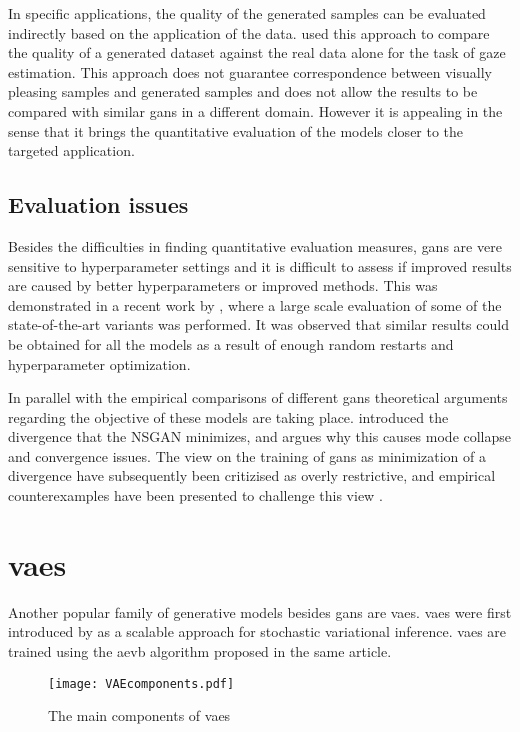 In specific applications, the quality of the generated samples can be evaluated indirectly based on the application of the data. \textcite{shrivastava2016learning} used this approach to compare the quality of a generated dataset against the real data alone for the task of gaze estimation. This approach does not guarantee correspondence between visually pleasing samples and generated samples and does not allow the results to be compared with similar \acrshort{gans} in a different domain. However it is appealing in the sense that it brings the quantitative evaluation of the models closer to the targeted application. 

\subsection{Evaluation issues}
Besides the difficulties in finding quantitative evaluation measures, \acrshort{gans} are vere sensitive to hyperparameter settings and it is difficult to assess if improved results are caused by better hyperparameters or improved methods. This was demonstrated in a recent work by \textcite{lucic2017gans}, where a large scale evaluation of some of the state-of-the-art variants was performed. It was observed that similar results could be obtained for all the models as a result of enough random restarts and hyperparameter optimization.

In parallel with the empirical comparisons of different \acrshort{gans} theoretical arguments regarding the objective of these models are taking place. \textcite{arjovsky2017towards} introduced the divergence that the NSGAN minimizes, and argues why this causes mode collapse and convergence issues. The view on the training of \acrshort{gans} as minimization of a divergence have subsequently been critizised as overly restrictive, and empirical counterexamples have been presented to challenge this view \parencite{fedus2017many}.


\section{\acrlong{vaes}}
Another popular family of generative models besides \acrshort{gans} are \acrfull{vaes}. \acrlong{vaes} were first introduced by \textcite{kingma2013auto} as a scalable approach for stochastic variational inference. \acrshort{vaes} are trained using the \acrfull{aevb} algorithm proposed in the same article. 

\begin{figure}[t]
    \centering
    \texttt{[image: VAEcomponents.pdf]}
    \caption{The main components of \acrshort{vaes}}
    \label{fig:VAE}
\end{figure}

